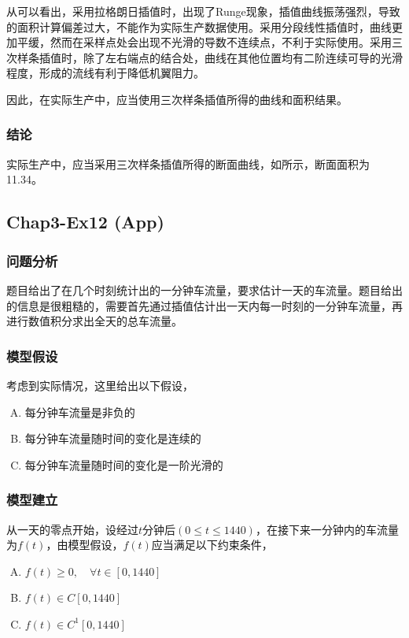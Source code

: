 \documentclass[12pt,a4paper]{article}
\begin{document}
从可以看出，采用拉格朗日插值时，出现了Runge现象，插值曲线振荡强烈，导致的面积计算偏差过大，不能作为实际生产数据使用。采用分段线性插值时，曲线更加平缓，然而在采样点处会出现不光滑的导数不连续点，不利于实际使用。采用三次样条插值时，除了左右端点的结合处，曲线在其他位置均有二阶连续可导的光滑程度，形成的流线有利于降低机翼阻力。

因此，在实际生产中，应当使用三次样条插值所得的曲线和面积结果。

\subsubsection{结论}

实际生产中，应当采用三次样条插值所得的断面曲线，如所示，断面面积为11.34。

\subsection{Chap3-Ex12 (App)}

\subsubsection{问题分析}

题目给出了在几个时刻统计出的一分钟车流量，要求估计一天的车流量。题目给出的信息是很粗糙的，需要首先通过插值估计出一天内每一时刻的一分钟车流量，再进行数值积分求出全天的总车流量。

\subsubsection{模型假设}

考虑到实际情况，这里给出以下假设，
\begin{enumerate}[A.]
    \item 每分钟车流量是非负的
    \item 每分钟车流量随时间的变化是连续的
    \item 每分钟车流量随时间的变化是一阶光滑的
\end{enumerate}

\subsubsection{模型建立}

从一天的零点开始，设经过$t$分钟后$(0\le t \le 1440)$，在接下来一分钟内的车流量为$f(t)$，由模型假设，$f(t)$应当满足以下约束条件，
\begin{enumerate}[A.]
    \item $f(t) \ge 0, \quad \forall t \in [0, 1440]$
    \item $f(t) \in C[0, 1440]$
    \item $f(t) \in C^1[0, 1440]$
\end{enumerate}
\end{document}
